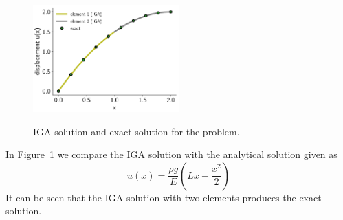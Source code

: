 \documentclass[submit,12pt]{aiaa-pretty} %
\begin{document}
\begin{figure}
  \centering
  \includegraphics[width=0.5\textwidth]{figures/bar-solution.pdf} \\
  \caption{IGA solution and exact solution for the problem.}
  \label{fig:bar-solution}
\end{figure}
In Figure~\ref{fig:bar-solution} we compare the IGA solution with the analytical solution given as
\begin{equation}\nonumber
  u(x) = \frac{\rho g}{E} \left( Lx - \frac{x^2}{2}\right)
\end{equation}
It can be seen that the IGA solution with two elements produces the
exact solution.
\end{document}
